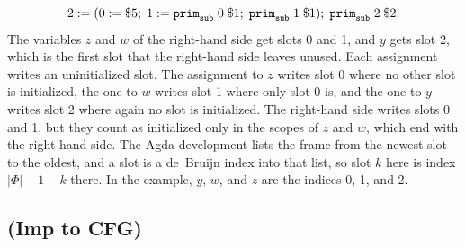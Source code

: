 \[
  2 \mathrel{:=} (0 \mathrel{:=} \$5;\; 1 \mathrel{:=} \mathtt{prim}_{\mathtt{sub}}\;0\;\$1;\;
    \mathtt{prim}_{\mathtt{sub}}\;1\;\$1);\; \mathtt{prim}_{\mathtt{sub}}\;2\;\$2.
\]
The variables $z$ and $w$ of the right-hand side get slots 0 and 1, and $y$ gets
slot 2, which is the first slot that the right-hand side leaves unused. Each
assignment writes an uninitialized slot. The assignment to $z$ writes slot 0
where no other slot is initialized, the one to $w$ writes slot 1 where only
slot 0 is, and the one to $y$ writes slot 2 where again no slot is initialized.
The right-hand side writes slots 0 and 1, but they count as initialized only in
the scopes of $z$ and $w$, which end with the right-hand side. The Agda development lists the frame from the newest slot
to the oldest, and a slot is a de~Bruijn index into that list, so slot $k$ here
is index $|\Phi| - 1 - k$ there. In the example, $y$, $w$, and $z$ are the
indices 0, 1, and 2.

\subsection{ (Imp to CFG)}
\label{app:pass-explicate}

